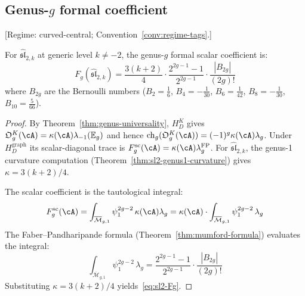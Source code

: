 \subsection{\texorpdfstring{Genus-$g$ formal coefficient}{Genus-g formal coefficient}}\label{subsec:sl2-free-energy}

\begin{theorem}\label{thm:sl2-all-genera}

\textup{[Regime: curved-central\textup{;}
Convention~\textup{\ref{conv:regime-tags}}.]}

For $\widehat{\mathfrak{sl}}_{2,k}$ at generic level $k \neq -2$, the genus-$g$ formal scalar coefficient is:
\begin{equation}\label{eq:sl2-Fg}
F_g(\widehat{\mathfrak{sl}}_{2,k}) = \frac{3(k+2)}{4} \cdot \frac{2^{2g-1}-1}{2^{2g-1}} \cdot \frac{|B_{2g}|}{(2g)!}
\end{equation}
where $B_{2g}$ are the Bernoulli numbers ($B_2 = \frac{1}{6}$, $B_4 = -\frac{1}{30}$, $B_6 = \frac{1}{42}$, $B_8 = -\frac{1}{30}$, $B_{10} = \frac{5}{66}$).
\end{theorem}

\begin{proof}
By Theorem~\ref{thm:genus-universality}, $H_D^K$ gives
$\mathfrak O_g^K(\cA)=\kappa(\cA)\lambda_{-1}(\mathbb E_g)$ and hence
$\operatorname{ch}_g(\mathfrak O_g^K(\cA))=
(-1)^g\kappa(\cA)\lambda_g$.  Under~$H_D^{\mathrm{graph}}$ its
scalar-diagonal trace is
$F_g^{\mathrm{sc}}(\cA)=\kappa(\cA)\lambda_g^{\mathrm{FP}}$. For
$\widehat{\mathfrak{sl}}_{2,k}$, the genus-1 curvature computation
(Theorem~\ref{thm:sl2-genus1-curvature}) gives
$\kappa = 3(k+2)/4$.

The scalar coefficient is the tautological integral:
\[
F_g^{\mathrm{sc}}(\cA) =
\int_{\overline{\mathcal{M}}_{g,1}} \psi_1^{2g-2}\,
\kappa(\cA)\lambda_g
= \kappa(\cA) \cdot
\int_{\overline{\mathcal{M}}_{g,1}} \psi_1^{2g-2}\, \lambda_g
\]
The Faber--Pandharipande formula (Theorem~\ref{thm:mumford-formula}) evaluates the integral:
\[
\int_{\overline{\mathcal{M}}_{g,1}} \psi_1^{2g-2}\, \lambda_g = \frac{2^{2g-1}-1}{2^{2g-1}} \cdot \frac{|B_{2g}|}{(2g)!}
\]
Substituting $\kappa = 3(k+2)/4$ yields~\eqref{eq:sl2-Fg}.
\end{proof}

